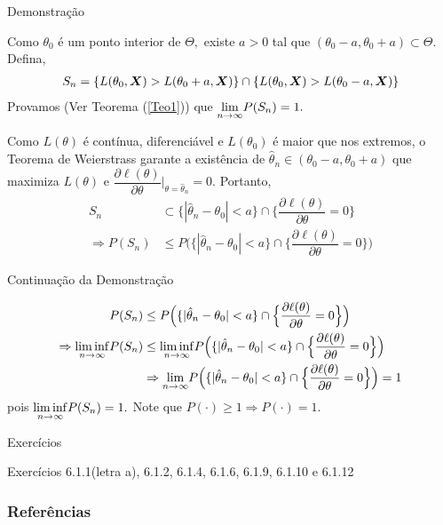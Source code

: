 \documentclass[12pt]{beamer}
\begin{document}
\begin{frame}{Demonstração}
	\vspace{-0.5cm}
\begin{block}{}
\justifying
\small
Como $\theta_{0}$ é um ponto interior de $\Theta,$ existe $a>0$ tal que $(\theta_{0}-a,\theta_{0}+a)\subset\Theta.$ Defina, 
\begin{align*}
    S_{n}=\{L(\theta_{0},\boldsymbol{X})>L(\theta_{0}+a,\boldsymbol{X})\}\cap \{L(\theta_{0},\boldsymbol{X})>L(\theta_{0}-a,\boldsymbol{X})\}
\end{align*}
Provamos (Ver Teorema (\ref{Teo1})) que ${\displaystyle \lim_{n\to\infty}} P(S_{n})=1.$
\end{block}
\begin{block}{}
\justifying
\small
Como $L(\theta)$ é contínua, diferenciável e $L(\theta_{0})$ é maior que nos extremos, 
o Teorema de Weierstrass garante a existência de $\hat{\theta}_{n} \in (\theta_{0}-a,\theta_{0}+a)$ que maximiza $L(\theta)$ e $\dfrac{\partial \ell(\theta)}{\partial\theta}|_{\theta=\hat{\theta}_{n}}=0.$ Portanto, 
\begin{align*}
    S_{n}&\subset \{|\hat{\theta}_{n}-\theta_{0}|<a\}\cap\Big\{\dfrac{\partial \ell(\theta)}{\partial\theta}=0\Big\}\\
    \Rightarrow P(S_{n})&\leq P\Big(\{|\hat{\theta}_{n}-\theta_{0}|<a\}\cap\Big\{\dfrac{\partial \ell(\theta)}{\partial\theta}=0\Big\}\Big)
\end{align*}
\end{block}
\end{frame}

\begin{frame}{Continuação da Demonstração}
\begin{block}{}
\begin{align*}
P(S_{n})&\leq P\Big(\{|\hat{\theta}_{n}-\theta_{0}|<a\}\cap\Big\{\dfrac{\partial \ell(\theta)}{\partial\theta}=0\Big\}\Big)\\
\Rightarrow {\displaystyle \liminf_{n\to\infty}} P(S_{n})&\leq {\displaystyle \liminf_{n\to\infty}} P\Big(\{|\hat{\theta}_{n}-\theta_{0}|<a\}\cap\Big\{\dfrac{\partial \ell(\theta)}{\partial\theta}=0\Big\}\Big)\\
&\Rightarrow {\displaystyle \lim_{n\to\infty}} P\Big(\{|\hat{\theta}_{n}-\theta_{0}|<a\}\cap\Big\{\dfrac{\partial \ell(\theta)}{\partial\theta}=0\Big\}\Big)=1
\end{align*}
pois ${\displaystyle \liminf_{n\to\infty}} P(S_{n})=1.$ Note que $P(\cdot)\geq 1\Rightarrow P(\cdot)=1.$
\end{block}
\end{frame}

\begin{frame}{Exercícios}
\begin{block}{\Home}
\justifying
Exercícios 6.1.1(letra a), 6.1.2, 6.1.4, 6.1.6,
6.1.9, 6.1.10 e 6.1.12
\nocite{hogg, casella2021statistical, bolfarine}
\end{block}
\end{frame}

\begin{frame}[allowframebreaks]
\frametitle{\bf Referências}
\printbibliography
\end{frame}
\end{document}
